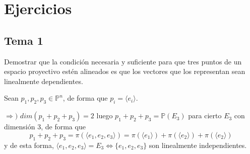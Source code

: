 \chapter{Ejercicios}
\section{Tema 1}
\begin{ejer} [2] Demostrar que la condici\'on necesaria y suficiente para que tres puntos de un espacio proyectivo est\'en alineados es que los vectores que los representan sean linealmente dependientes.
\end{ejer}
\begin{sol}
    Sean $p_1, p_2, p_3 \in \mathbb P^n$, de forma que $p_i = \langle e_i\rangle$. 
    
    $\Rightarrow)$ $dim (p_1+p_2+p_3) = 2$ luego $p_1+p_2+p_3 = \mathbb P(E_3)$ para cierto $E_3$ con dimensi\'on 3, de forma que
    $$p_1+p_2+p_3=\pi(\langle e_1, e_2, e_3\rangle) = \pi(\langle e_1\rangle) + \pi(\langle e_2\rangle) + \pi(\langle e_2\rangle)$$
    y de esta forma, $\langle e_1, e_2, e_3\rangle = E_3 \iff \{ e_1, e_2, e_3\}$ son linealmente independientes.
\end{sol}

